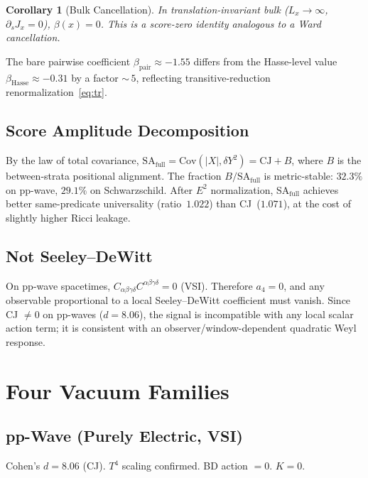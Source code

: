 \documentclass[12pt,a4paper]{article}
\newtheorem{corollary}{Corollary}
\begin{document}
\begin{corollary}[Bulk Cancellation]
In translation-invariant bulk ($L_x \to \infty$, $\partial_s J_x = 0$), $\beta(x) = 0$. This is a score-zero identity analogous to a Ward cancellation.
\end{corollary}

\noindent The bare pairwise coefficient $\beta_{\mathrm{pair}} \approx -1.55$ differs from the Hasse-level value $\beta_{\mathrm{Hasse}} \approx -0.31$ by a factor ${\sim}\,5$, reflecting transitive-reduction renormalization~\eqref{eq:tr}.

\subsection{Score Amplitude Decomposition}

By the law of total covariance, $\mathrm{SA}_{\mathrm{full}} = \mathrm{Cov}(|X|, \delta Y^2) = \mathrm{CJ} + B$, where $B$ is the between-strata positional alignment. The fraction $B/\mathrm{SA}_{\mathrm{full}}$ is metric-stable: $32.3\%$ on pp-wave, $29.1\%$ on Schwarzschild. After $E^2$ normalization, SA$_{\mathrm{full}}$ achieves better same-predicate universality (ratio~$1.022$) than CJ~($1.071$), at the cost of slightly higher Ricci leakage.

\subsection{Not Seeley--DeWitt}

On pp-wave spacetimes, $C_{\alpha\beta\gamma\delta}C^{\alpha\beta\gamma\delta} = 0$ (VSI). Therefore $a_4 = 0$, and any observable proportional to a local Seeley--DeWitt coefficient must vanish. Since CJ $\neq 0$ on pp-waves ($d = 8.06$), the signal is incompatible with any local scalar action term; it is consistent with an observer/window-dependent quadratic Weyl response.

\section{Four Vacuum Families}

\subsection{pp-Wave (Purely Electric, VSI)}
Cohen's $d = 8.06$ (CJ). $T^4$ scaling confirmed. BD action $= 0$. $K = 0$.
\end{document}

